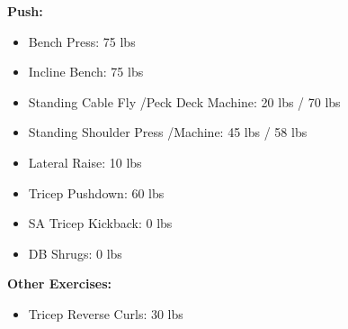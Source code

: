 \documentclass{article}
\begin{document}
\def\bp{75 }
\def\ib{75 }
\def\scf{20 }
\def\pdm{70 }
\def\ssp{45 }
\def\sspm{58 }
\def\lr{10 }
\def\tp{60 }
\def\satk{0 }
\def\dbs{0 }
\def\trc{30 }

\def\rdl{45 }
\def\gk{60 }
\def\lbe{160 }
\def\lp{160 }

\textbf{Push:}
\begin{itemize}
	\item Bench Press: \hfill\bp lbs
	\item Incline Bench: \hfill\ib lbs
	\item Standing Cable Fly \slash\space Peck Deck Machine: \hfill\scf lbs / \pdm lbs
	\item Standing Shoulder Press \slash\space Machine: \hfill\ssp lbs / \sspm lbs
	\item Lateral Raise: \hfill\lr lbs
	\item Tricep Pushdown: \hfill\tp lbs
	\item SA Tricep Kickback: \hfill\satk lbs
	\item DB Shrugs: \hfill\dbs lbs
\end{itemize}\leavevmode\newline

\textbf{Other Exercises:}
\begin{itemize}
	\item Tricep Reverse Curls: \hfill\trc lbs
\end{itemize}
\end{document}
